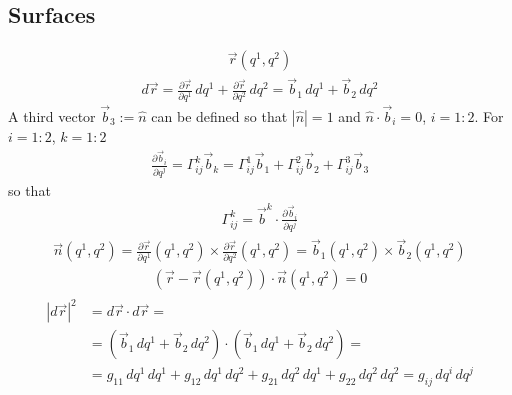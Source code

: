 \documentclass[letterpaper,10pt,english]{jupyterBook}
\begin{document}
\subsection{Surfaces}
\label{\detokenize{ch/differential-geometry/intro:surfaces}}\begin{equation*}
\begin{split}\vec{r}(q^1, q^2)\end{split}
\end{equation*}\begin{equation*}
\begin{split}d \vec{r} =
  \frac{\partial \vec{r}}{\partial q^1} \, d q^1 + \frac{\partial \vec{r}}{\partial q^2} \, d q^2 =
  \vec{b}_1 \, d q^1 + \vec{b}_2 \, d q^2
\end{split}
\end{equation*}
\sphinxAtStartPar
A third vector \(\vec{b}_3 := \hat{n}\) can be defined so that \(|\hat{n}| = 1\) and \(\hat{n} \cdot \vec{b}_{i} = 0\), \(i=1:2\). For \(i=1:2\), \(k=1:2\)
\begin{equation*}
\begin{split}\frac{\partial \vec{b}_i}{\partial q^j} = \Gamma_{ij}^k \vec{b}_k = \Gamma_{ij}^1 \vec{b}_1 + \Gamma_{ij}^2 \vec{b}_2 + \Gamma_{ij}^3 \vec{b}_3\end{split}
\end{equation*}
\sphinxAtStartPar
so that
\begin{equation*}
\begin{split}\Gamma_{ij}^{k} = \vec{b}^k \cdot \frac{\partial \vec{b}_i}{\partial q^j}\end{split}
\end{equation*}
\sphinxAtStartPar
{}
\begin{equation*}
\begin{split}\vec{n}(q^1, q^2) = \frac{\partial \vec{r}}{\partial q^1}(q^1, q^2) \times \frac{\partial \vec{r}}{\partial q^2}(q^1, q^2) = \vec{b}_1(q^1, q^2) \times \vec{b}_2(q^1, q^2)\end{split}
\end{equation*}
\sphinxAtStartPar
{}
\begin{equation*}
\begin{split}(\vec{r} - \vec{r}(q^1, q^2)) \cdot \vec{n}(q^1, q^2) = 0\end{split}
\end{equation*}
\sphinxAtStartPar
{}
\begin{equation*}
\begin{split}\begin{aligned}
|d \vec{r}|^2 
  & = d \vec{r} \cdot d \vec{r} = \\
  & = \left( \vec{b}_1 \, d q^1 + \vec{b}_2 \, d q^2 \right) \cdot \left( \vec{b}_1 \, d q^1 + \vec{b}_2 \, d q^2 \right) = \\
  & = g_{11} \, dq^1 \, dq^1 + g_{12} \, dq^1 \, dq^2 + g_{21} \, dq^2 \, dq^1 + g_{22} \, dq^2 \, d q^2 = g_{ij} \, dq^i \, dq^j 
\end{aligned}\end{split}
\end{equation*}
\end{document}
